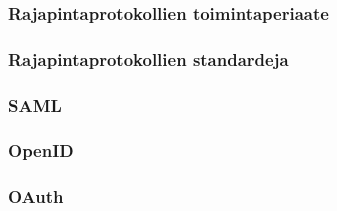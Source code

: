 
\subsubsection{Rajapintaprotokollien toimintaperiaate}

\subsubsection{Rajapintaprotokollien standardeja}

\subsubsection{SAML}

\subsubsection{OpenID}

\subsubsection{OAuth}
